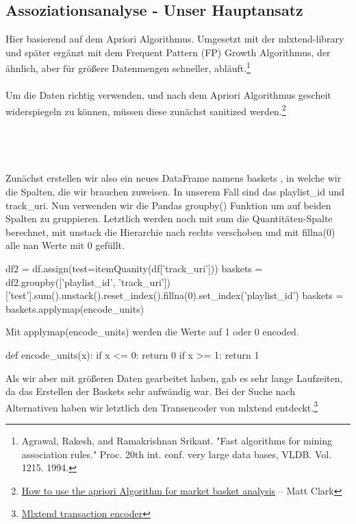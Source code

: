 \documentclass[12pt]{article}
\begin{document}
\subsection{Assoziationsanalyse - Unser Hauptansatz}
\label{Assoziationsanalyse}
Hier basierend auf dem Apriori Algorithmus. Umgesetzt mit der mlxtend-library und später ergänzt mit dem Frequent Pattern (FP) Growth Algorithmus, der ähnlich, aber für größere Datenmengen schneller, abläuft.\footnote{Agrawal, Rakesh, and Ramakrishnan Srikant. "Fast algorithms for mining association rules." Proc. 20th int. conf. very large data bases, VLDB. Vol. 1215. 1994.}
\\\\
Um die Daten richtig verwenden, und nach dem Apriori Algorithmus gescheit widerspiegeln zu können, müssen diese zunächst sanitized werden.\footnote{\href{https://practicaldatascience.co.uk/data-science/how-to-use-the-apriori-algorithm-for-market-basket-analysis}{How to use the apriori Algorithm for market basket analysis} -- Matt Clark}
\\\\\\\\\\
Zunächst erstellen wir also ein neues DataFrame namens baskets , in welche wir die
Spalten, die wir brauchen zuweisen. 
In unserem Fall sind das playlist\_id und track\_uri.
Nun verwenden wir die Pandas groupby() Funktion um auf beiden Spalten zu gruppieren. Letztlich werden noch mit \color{mymauve}sum \color{black} die Quantitäten-Spalte berechnet, mit \color{mymauve}unstack \color{black} die Hierarchie nach rechts verschoben und mit \color{mymauve}fillna(0) \color{black} alle nan Werte mit 0 gefüllt.
\begin{python}
df2 = df.assign(test=itemQuanity(df['track_uri']))
baskets = df2.groupby(['playlist_id', 'track_uri'])['test'].sum().unstack().reset_index().fillna(0).set_index('playlist_id')
baskets = baskets.applymap(encode_units)
\end{python}
Mit \color{mymauve}applymap(encode\_units) \color{black} werden die Werte auf 1 oder 0 encoded.
\begin{python}
def encode_units(x):
    if x <= 0:
        return 0
    if x >= 1:
        return 1
\end{python}
Als wir aber mit größeren Daten gearbeitet haben, gab es sehr lange Laufzeiten, da das Erstellen der Baskets sehr aufwändig war. Bei der Suche nach Alternativen haben wir letztlich den Transencoder von mlxtend entdeckt.\footnote{\href{http://rasbt.github.io/mlxtend/user_guide/preprocessing/TransactionEncoder/}{Mlxtend transaction encoder}} 
\end{document}
